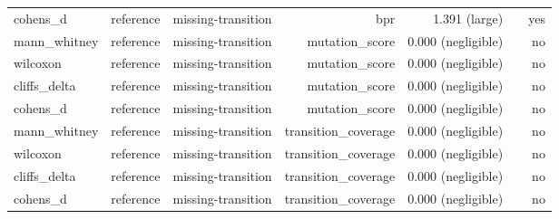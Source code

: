 \begin{table}[t]
\begin{tabular}{lrrrrrr}
cohens\_d & reference & missing-transition & bpr & 1.391 (large) &  & yes \\
mann\_whitney & reference & missing-transition & mutation\_score & 0.000 (negligible) &  & no \\
wilcoxon & reference & missing-transition & mutation\_score & 0.000 (negligible) &  & no \\
cliffs\_delta & reference & missing-transition & mutation\_score & 0.000 (negligible) &  & no \\
cohens\_d & reference & missing-transition & mutation\_score & 0.000 (negligible) &  & no \\
mann\_whitney & reference & missing-transition & transition\_coverage & 0.000 (negligible) &  & no \\
wilcoxon & reference & missing-transition & transition\_coverage & 0.000 (negligible) &  & no \\
cliffs\_delta & reference & missing-transition & transition\_coverage & 0.000 (negligible) &  & no \\
cohens\_d & reference & missing-transition & transition\_coverage & 0.000 (negligible) &  & no \\
\bottomrule
\end{tabular}
\end{table}
